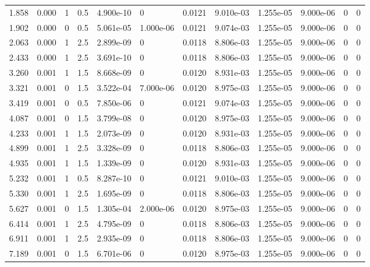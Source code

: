 \documentclass[preview]{standalone}
\begin{document}
{{\begin{tabular}{L{1.2cm}C{1.2cm} C{0.3cm}C{0.5cm} C{1.4cm}C{1.4cm} C{1.4cm}C{1.4cm} C{1.6cm}C{1.6cm} C{1.6cm}C{1.6cm}}
  1.858  &  0.000  & 1     & 0.5 &  4.900e-10  & 0  &  0.0121&   9.010e-03& 1.255e-05 & 9.000e-06   &  0 & 0  \\ 
  1.902  &  0.000  & 0     & 0.5 &  5.061e-05  & 1.000e-06  &  0.0121&   9.074e-03& 1.255e-05 & 9.000e-06   &  0 & 0  \\ 
  2.063  &  0.000  & 1     & 2.5 &  2.899e-09  & 0  &  0.0118&   8.806e-03& 1.255e-05 & 9.000e-06   &  0 & 0  \\ 
  2.433  &  0.000  & 1     & 2.5 &  3.691e-10  & 0  &  0.0118&   8.806e-03& 1.255e-05 & 9.000e-06   &  0 & 0  \\ 
  3.260  &  0.001  & 1     & 1.5 &  8.668e-09  & 0  &  0.0120&   8.931e-03& 1.255e-05 & 9.000e-06   &  0 & 0  \\ 
  3.321  &  0.001  & 0     & 1.5 &  3.522e-04  & 7.000e-06  &  0.0120&   8.975e-03& 1.255e-05 & 9.000e-06   &  0 & 0  \\ 
  3.419  &  0.001  & 0     & 0.5 &  7.850e-06  & 0  &  0.0121&   9.074e-03& 1.255e-05 & 9.000e-06   &  0 & 0  \\ 
  4.087  &  0.001  & 0     & 1.5 &  3.799e-08  & 0  &  0.0120&   8.975e-03& 1.255e-05 & 9.000e-06   &  0 & 0  \\ 
  4.233  &  0.001  & 1     & 1.5 &  2.073e-09  & 0  &  0.0120&   8.931e-03& 1.255e-05 & 9.000e-06   &  0 & 0  \\ 
  4.899  &  0.001  & 1     & 2.5 &  3.328e-09  & 0  &  0.0118&   8.806e-03& 1.255e-05 & 9.000e-06   &  0 & 0  \\ 
  4.935  &  0.001  & 1     & 1.5 &  1.339e-09  & 0  &  0.0120&   8.931e-03& 1.255e-05 & 9.000e-06   &  0 & 0  \\ 
  5.232  &  0.001  & 1     & 0.5 &  8.287e-10  & 0  &  0.0121&   9.010e-03& 1.255e-05 & 9.000e-06   &  0 & 0  \\ 
  5.330  &  0.001  & 1     & 2.5 &  1.695e-09  & 0  &  0.0118&   8.806e-03& 1.255e-05 & 9.000e-06   &  0 & 0  \\ 
  5.627  &  0.001  & 0     & 1.5 &  1.305e-04  & 2.000e-06  &  0.0120&   8.975e-03& 1.255e-05 & 9.000e-06   &  0 & 0  \\ 
  6.414  &  0.001  & 1     & 2.5 &  4.795e-09  & 0  &  0.0118&   8.806e-03& 1.255e-05 & 9.000e-06   &  0 & 0  \\ 
  6.911  &  0.001  & 1     & 2.5 &  2.935e-09  & 0  &  0.0118&   8.806e-03& 1.255e-05 & 9.000e-06   &  0 & 0  \\ 
  7.189  &  0.001  & 0     & 1.5 &  6.701e-06  & 0  &  0.0120&   8.975e-03& 1.255e-05 & 9.000e-06   &  0 & 0  \\ 

\end{tabular}}}
\end{document}
